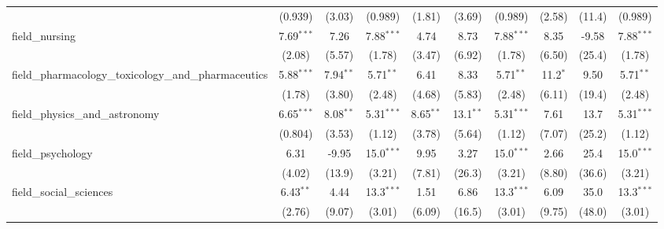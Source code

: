 \begin{tabular}{lccccccccc}
                                                               & (0.939)       & (3.03)        & (0.989)       & (1.81)        & (3.69)         & (0.989)       & (2.58)        & (11.4)         & (0.989)\\   
   field\_nursing                                              & 7.69$^{***}$  & 7.26          & 7.88$^{***}$  & 4.74          & 8.73           & 7.88$^{***}$  & 8.35          & -9.58          & 7.88$^{***}$\\   
                                                               & (2.08)        & (5.57)        & (1.78)        & (3.47)        & (6.92)         & (1.78)        & (6.50)        & (25.4)         & (1.78)\\   
   field\_pharmacology\_toxicology\_and\_pharmaceutics         & 5.88$^{***}$  & 7.94$^{**}$   & 5.71$^{**}$   & 6.41          & 8.33           & 5.71$^{**}$   & 11.2$^{*}$    & 9.50           & 5.71$^{**}$\\   
                                                               & (1.78)        & (3.80)        & (2.48)        & (4.68)        & (5.83)         & (2.48)        & (6.11)        & (19.4)         & (2.48)\\   
   field\_physics\_and\_astronomy                              & 6.65$^{***}$  & 8.08$^{**}$   & 5.31$^{***}$  & 8.65$^{**}$   & 13.1$^{**}$    & 5.31$^{***}$  & 7.61          & 13.7           & 5.31$^{***}$\\   
                                                               & (0.804)       & (3.53)        & (1.12)        & (3.78)        & (5.64)         & (1.12)        & (7.07)        & (25.2)         & (1.12)\\   
   field\_psychology                                           & 6.31          & -9.95         & 15.0$^{***}$  & 9.95          & 3.27           & 15.0$^{***}$  & 2.66          & 25.4           & 15.0$^{***}$\\   
                                                               & (4.02)        & (13.9)        & (3.21)        & (7.81)        & (26.3)         & (3.21)        & (8.80)        & (36.6)         & (3.21)\\   
   field\_social\_sciences                                     & 6.43$^{**}$   & 4.44          & 13.3$^{***}$  & 1.51          & 6.86           & 13.3$^{***}$  & 6.09          & 35.0           & 13.3$^{***}$\\   
                                                               & (2.76)        & (9.07)        & (3.01)        & (6.09)        & (16.5)         & (3.01)        & (9.75)        & (48.0)         & (3.01)\\   

\end{tabular}
